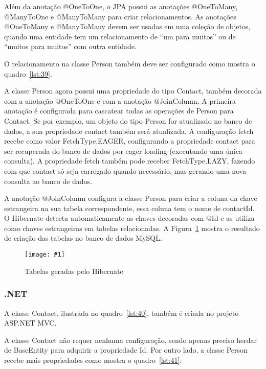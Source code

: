 \documentclass[a4paper,12pt]{article}
\newcommand{\figura}[3] {
	\begin{figure}[ht]
		\centering
		\texttt{[image: \#1]}
		\caption{#2}
		\label{#3}
	\end{figure}
	\FloatBarrier
}
\newcommand{\javacode}[3] {
	
	\FloatBarrier
}
\newcommand{\sharpcode}[3] {
	
	\FloatBarrier
}
\begin{document}
Além da anotação @OneToOne, o JPA possui as anotações @OneToMany, @ManyToOne e @ManyToMany para criar relacionamentos. As anotações @OneToMany e @ManyToMany devem ser usadas em uma coleção de objetos, quando uma entidade tem um relacionamento de “um para muitos” ou de “muitos para muitos” com outra entidade.

O relacionamento na classe Person também deve ser configurado como mostra o quadro~\ref{lst:39}.

\javacode{code/39.txt}{Classe Person com relacionamento para Contact}{lst:39}

A classe Person agora possui uma propriedade do tipo Contact, também decorada com a anotação @OneToOne e com a anotação @JoinColumn. A primeira anotação é configurada para cascatear todas as operações de Person para Contact. Se por exemplo, um objeto do tipo Person for atualizado no banco de dados, a sua propriedade contact também será atualizada. A configuração fetch recebe como valor FetchType.EAGER, configurando a propriedade contact para ser recuperada do banco de dados por eager loading (executando uma única consulta). A propriedade fetch também pode receber FetchType.LAZY, fazendo com que contact só seja carregado quando necessário, mas gerando uma nova consulta ao banco de dados.

A anotação @JoinColumn configura a classe Person para criar a coluna da chave estrangeira na sua tabela correspondente, essa coluna tem o nome de contactId. O Hibernate detecta automaticamente as chaves decoradas com @Id e as utiliza como chaves estrangeiras em tabelas relacionadas. A Figura~\ref{fig:36} mostra o resultado de criação das tabelas no banco de dados MySQL. 

\figura{36.png}{Tabelas geradas pelo Hibernate}{fig:36}

\subsubsection{.NET}

A classe Contact, ilustrada no quadro~\ref{lst:40}, também é criada no projeto ASP.NET MVC.

\sharpcode{code/40.txt}{Classe Contact no projeto ASP.NET MVC}{lst:40}

A classe Contact não requer nenhuma configuração, sendo apenas preciso herdar de BaseEntity para adquirir a propriedade Id. Por outro lado, a classe Person recebe mais propriedades como mostra o quadro~\ref{lst:41}.

\sharpcode{code/41.txt}{Classe Person no projeto ASP.NET com novas propriedades}{lst:41}
\end{document}

